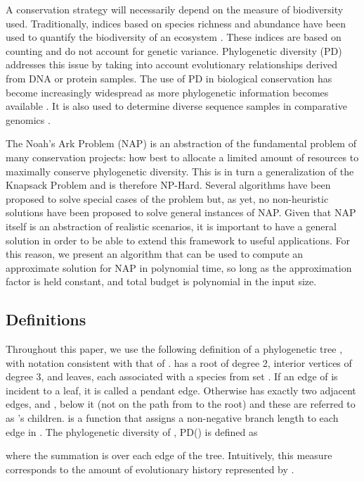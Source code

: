\documentclass[10pt]{llncs}       \usepackage{graphicx,subfigure}
\begin{document}
A conservation strategy will necessarily 
depend on the measure of biodiversity used. 
Traditionally, indices based on species richness and abundance have been
used to quantify the biodiversity of an ecosystem \cite{magurran04}. 
These indices are based on counting and do not account for genetic variance.
Phylogenetic diversity (PD) 
\cite{faith92} addresses this issue by taking into account evolutionary
relationships derived from DNA or protein samples.  
The use of PD in biological conservation has become 
increasingly widespread as more phylogenetic information becomes 
available \cite{heard00}.  It is also used to determine diverse
sequence samples in comparative genomics \cite{pardi05}. 

The Noah's Ark Problem (NAP) \cite{weitzman98} is an abstraction of the
fundamental problem of many conservation projects:  how best to allocate
a limited amount of resources to maximally conserve phylogenetic diversity.  
This
is in turn a generalization of the Knapsack Problem \cite{garey79} and
is therefore NP-Hard.  Several algorithms have been proposed to solve special
cases of the problem but, as yet, no non-heuristic solutions have been
proposed to solve general instances of NAP.  Given that NAP itself is
an abstraction of realistic scenarios, it is important to have a general
solution in order to be able to extend this framework
 to useful applications.  For
this reason, we present an algorithm that
can be used to compute an approximate solution for NAP
in polynomial time, so long as the approximation factor is held constant, 
and total budget is polynomial in the input size.

\subsection{Definitions}

Throughout this paper, we use the following definition
of a phylogenetic tree , with notation consistent
with that of \cite{hartmann06}.   has a root of 
degree 2, interior vertices of degree 3, and  leaves, each associated
with a species from set . If an edge  of 
is incident to a leaf, it is
called a pendant edge.  Otherwise  has exactly two adjacent edges, 
 and , below it (not on the path from  to the
root) and these are referred to as 's children. 
 is a function that assigns a  non-negative branch length to each
edge in .  The phylogenetic
diversity of , PD() is defined as

where the summation is over each edge  of the tree.  Intuitively, this
measure corresponds to the amount of evolutionary history represented 
by .
\end{document}
